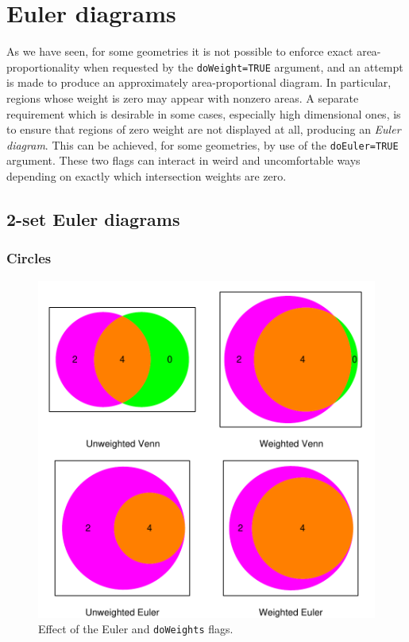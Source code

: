 \documentclass[a4paper]{article}
\begin{document}
\newpage
\section{Euler diagrams}

As we have seen, for some geometries it is not possible
to enforce exact area-proportionality when requested by the \texttt{doWeight=TRUE} argument,
and an attempt is made to produce an approximately area-proportional diagram. In
particular, regions whose weight is zero may appear with nonzero areas.
 A separate 
requirement which is desirable in some cases, especially high dimensional ones,
is to ensure that regions of zero weight are not displayed at all, producing an \emph{Euler diagram}. 
This can be achieved, for some geometries, by use of the \texttt{doEuler=TRUE} argument.
These two flags can interact in weird and uncomfortable ways depending on
exactly which intersection weights are zero.

\subsection{2-set Euler diagrams}

\subsubsection{Circles}


\begin{figure}[H]\begin{center}
\includegraphics{Vennfig-p2threef01}
\caption{Effect of the Euler and \texttt{doWeights} flags.}
\end{center}\end{figure}
\end{document}
